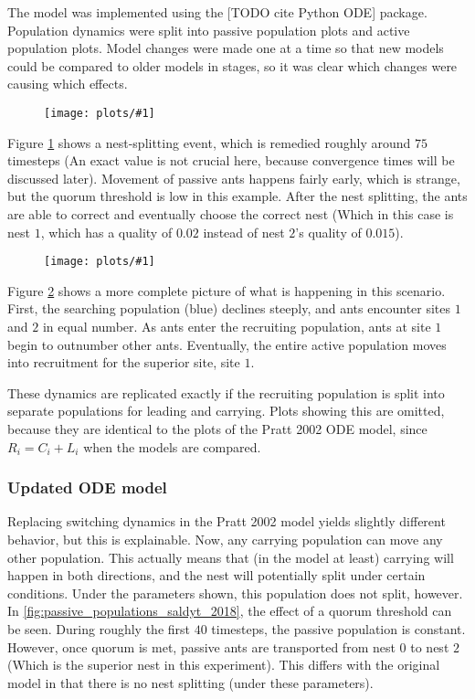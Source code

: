 \documentclass{article}
\newcommand{\plot}[3]{
    \begin{figure}[h]
        \texttt{[image: plots/\#1]}
        \caption{#2}
        \label{fig:#1}
    \end{figure}
}
\begin{document}
The model was implemented using the [TODO cite Python ODE] package.
Population dynamics were split into passive population plots and active population plots.
Model changes were made one at a time so that new models could be compared to older models in stages, so it was clear which changes were causing which effects.

\plot{passive_populations_pratt_2002}{}{0.5}

Figure \ref{fig:passive_populations_pratt_2002} shows a nest-splitting event, which is remedied roughly around $75$ timesteps (An exact value is not crucial here, because convergence times will be discussed later).
Movement of passive ants happens fairly early, which is strange, but the quorum threshold is low in this example.
After the nest splitting, the ants are able to correct and eventually choose the correct nest (Which in this case is nest $1$, which has a quality of $0.02$ instead of nest $2$'s quality of $0.015$).

\plot{active_populations_pratt_2002}{}{0.5}

Figure \ref{fig:active_populations_pratt_2002} shows a more complete picture of what is happening in this scenario.
First, the searching population (blue) declines steeply, and ants encounter sites $1$ and $2$ in equal number. 
As ants enter the recruiting population, ants at site $1$ begin to outnumber other ants.
Eventually, the entire active population moves into recruitment for the superior site, site $1$.

These dynamics are replicated exactly if the recruiting population is split into separate populations for leading and carrying. Plots showing this are omitted, because they are identical to the plots of the Pratt 2002 ODE model, since $R_i = C_i + L_i$ when the models are compared.


\subsubsection{Updated ODE model}

Replacing switching dynamics in the Pratt 2002 model yields slightly different behavior, but this is explainable.
Now, any carrying population can move any other population.
This actually means that (in the model at least) carrying will happen in both directions, and the nest will potentially split under certain conditions.
Under the parameters shown, this population does not split, however.
In \ref{fig:passive_populations_saldyt_2018}, the effect of a quorum threshold can be seen.
During roughly the first $40$ timesteps, the passive population is constant.
However, once quorum is met, passive ants are transported from nest $0$ to nest $2$ (Which is the superior nest in this experiment). 
This differs with the original model in that there is no nest splitting (under these parameters).
\end{document}
